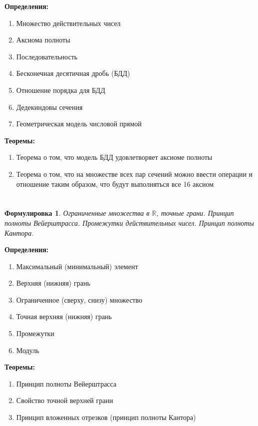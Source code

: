 \documentclass[a4paper]{article}
\newcommand{\R}{\mathbb{R}}
\theoremstyle{plain}
\newtheorem*{st}{Формулировка}
\theoremstyle{definition}
\theoremstyle{remark}
\begin{document}
\textbf{Определения:}
\begin{enumerate}
    \item Множество действительных чисел
    \item Аксиома полноты
    \item Последовательность
    \item Бесконечная десятичная дробь (БДД)
    \item Отношение порядка для БДД
    \item Дедекиндовы сечения
    \item Геометрическая модель числовой прямой
\end{enumerate}

\textbf{Теоремы:}
\begin{enumerate}
    \item Теорема о том, что модель БДД удовлетворяет аксиоме полноты
    \item Теорема о том, что на множестве всех пар сечений можно ввести операции и отношение таким образом, что будут выполняться все 16 аксиом
\end{enumerate}


\section{}
\begin{st}
    Ограниченные множества в $\R$, точные грани. Принцип полноты Вейерштрасса. Промежутки действительных чисел. Принцип полноты Кантора.
\end{st}

\textbf{Определения:}
\begin{enumerate}
    \item Максимальный (минимальный) элемент
    \item Верхняя (нижняя) грань
    \item Ограниченное (сверху, снизу) множество
    \item Точная верхняя (нижняя) грань
    \item Промежутки
    \item Модуль 
\end{enumerate}

\textbf{Теоремы:}
\begin{enumerate}
    \item Принцип полноты Вейерштрасса
    \item Свойство точной верхней грани
    \item Принцип вложенных отрезков (принцип полноты Кантора)
\end{enumerate}
\end{document}
